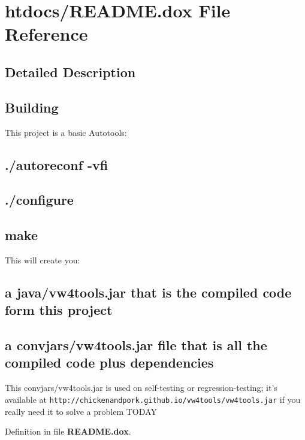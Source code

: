 \section{htdocs/\+R\+E\+A\+D\+M\+E.dox File Reference}
\label{README_8dox}


\subsection{Detailed Description}
\subsection*{Building }

This project is a basic Autotools\+: \subsection*{./autoreconf -\/vfi}

\subsection*{./configure}

\subsection*{make}

This will create you\+: \subsection*{a java/vw4tools.\+jar that is the compiled code form this project}

\subsection*{a convjars/vw4tools.\+jar file that is all the compiled code plus dependencies}

This convjars/vw4tools.\+jar is used on self-\/testing or regression-\/testing; it's available at {\tt http\+://chickenandpork.\+github.\+io/vw4tools/vw4tools.\+jar} if you really need it to solve a problem T\+O\+D\+A\+Y 

Definition in file {\bf R\+E\+A\+D\+M\+E.\+dox}.

